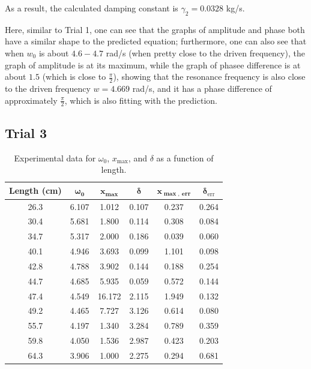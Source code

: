 \documentclass{article}
\begin{document}
\newpage

As a result, the calculated damping constant is $\gamma_2 = 0.0328$ kg/s.

\hfil

Here, similar to Trial 1, one can see that the graphs of amplitude and phase both have a similar shape to the predicted equation; furthermore, one can also see that when $w_0$ is about $4.6-4.7$ rad/s (when pretty close to the driven frequency), the graph of amplitude is at its maximum, while the graph of phasee difference is at about $1.5$ (which is close to $\frac{\pi}{2}$), showing that the resonance frequency is also close to the driven frequency $w=4.669$ rad/s, and it has a phase difference of approximately $\frac{\pi}{2}$, which is also fitting with the prediction.

\hfil

\subsection{Trial 3}
\begin{table}[h!]
\centering
\caption{Experimental data for $\omega_0$, $x_{\max}$, and $\delta$ as a function of length.}
\begin{tabular}{c c c c c c}
\hline
\textbf{Length (cm)} & $\boldsymbol{\omega_0}$ & $\boldsymbol{x_{\max}}$ & $\boldsymbol{\delta}$ & $\boldsymbol{x_{\max,\ err}}$ & $\boldsymbol{\delta_{\mathrm{err}}}$ \\
\hline
26.3 & 6.107 & 1.012 & 0.107 & 0.237 & 0.264 \\
30.4 & 5.681 & 1.800 & 0.114 & 0.308 & 0.084 \\
34.7 & 5.317 & 2.000 & 0.186 & 0.039 & 0.060 \\
40.1 & 4.946 & 3.693 & 0.099 & 1.101 & 0.098 \\
42.8 & 4.788 & 3.902 & 0.144 & 0.188 & 0.254 \\
44.7 & 4.685 & 5.935 & 0.059 & 0.572 & 0.144 \\
47.4 & 4.549 & 16.172 & 2.115 & 1.949 & 0.132 \\
49.2 & 4.465 & 7.727 & 3.126 & 0.614 & 0.080 \\
55.7 & 4.197 & 1.340 & 3.284 & 0.789 & 0.359 \\
59.8 & 4.050 & 1.536 & 2.987 & 0.423 & 0.203 \\
64.3 & 3.906 & 1.000 & 2.275 & 0.294 & 0.681 \\
\hline
\end{tabular}
\end{table}
\end{document}
